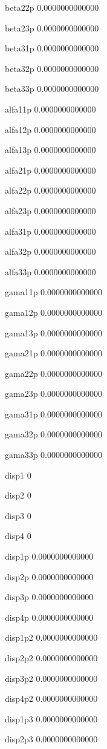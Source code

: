  beta22p
   0.0000000000000 
  
 beta23p
   0.0000000000000 
  
 beta31p
   0.0000000000000 
  
 beta32p
   0.0000000000000 
  
 beta33p
   0.0000000000000 
  
 alfa11p
   0.0000000000000 
  
 alfa12p
   0.0000000000000 
  
 alfa13p
   0.0000000000000 
  
 alfa21p
   0.0000000000000 
  
 alfa22p
   0.0000000000000 
  
 alfa23p
   0.0000000000000 
  
 alfa31p
   0.0000000000000 
  
 alfa32p
   0.0000000000000 
  
 alfa33p
   0.0000000000000 
  
 gama11p
   0.0000000000000 
  
 gama12p
   0.0000000000000 
  
 gama13p
   0.0000000000000 
  
 gama21p
   0.0000000000000 
  
 gama22p
   0.0000000000000 
  
 gama23p
   0.0000000000000 
  
 gama31p
   0.0000000000000 
  
 gama32p
   0.0000000000000 
  
 gama33p
   0.0000000000000 
  
 disp1  
 0 
  
 disp2  
 0 
  
 disp3  
 0 
  
 disp4  
 0 
  
 disp1p 
   0.0000000000000 
  
 disp2p 
   0.0000000000000 
  
 disp3p 
   0.0000000000000 
  
 disp4p 
   0.0000000000000 
  
 disp1p2
   0.0000000000000 
  
 disp2p2
   0.0000000000000 
  
 disp3p2
   0.0000000000000 
  
 disp4p2
   0.0000000000000 
  
 disp1p3
   0.0000000000000 
  
 disp2p3
   0.0000000000000 
  
